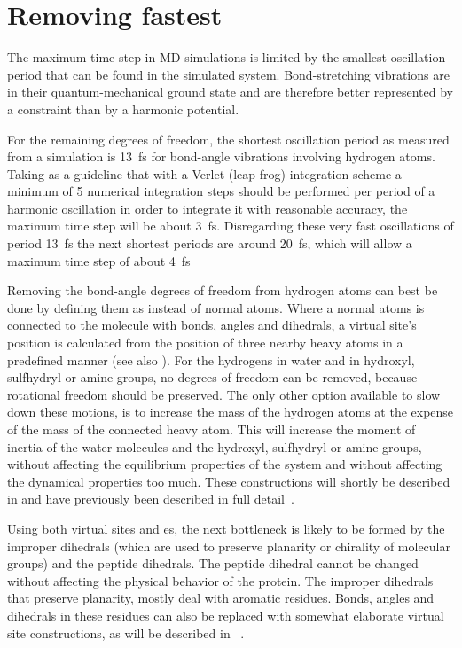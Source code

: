 \section{Removing fastest }
The maximum time step in MD simulations is limited by the smallest
oscillation period that can be found in the simulated
system. Bond-stretching vibrations are in their quantum-mechanical
ground state and are therefore better represented by a constraint than
by a harmonic potential.

For the remaining degrees of freedom, the shortest oscillation period
as measured from a simulation is 13~fs for bond-angle vibrations
involving hydrogen atoms. Taking as a guideline that with a Verlet
(leap-frog) integration scheme a minimum of 5 numerical integration
steps should be performed per period of a harmonic oscillation in
order to integrate it with reasonable accuracy, the maximum time step
will be about 3~fs. Disregarding these very fast oscillations of
period 13~fs the next shortest periods are around 20~fs, which will
allow a maximum time step of about 4~fs

Removing the bond-angle degrees of freedom from hydrogen atoms can
best be done by defining them as 
instead of normal atoms. Where a normal atoms is connected to the molecule
with bonds, angles and dihedrals, a virtual site's position is calculated
from the position of three nearby heavy atoms in a predefined manner
(see also ). For the hydrogens in water and in
hydroxyl, sulfhydryl or amine groups, no degrees of freedom can be
removed, because rotational freedom should be preserved. The only
other option available to slow down these motions, is to increase the
mass of the hydrogen atoms at the expense of the mass of the connected
heavy atom. This will increase the moment of inertia of the water
molecules and the hydroxyl, sulfhydryl or amine groups, without
affecting the equilibrium properties of the system and without
affecting the dynamical properties too much. These constructions will
shortly be described in  and have previously
been described in full detail~\cite{feenstra99}.

Using both virtual sites and es, the next
bottleneck is likely to be formed by the improper dihedrals (which are
used to preserve planarity or chirality of molecular groups) and the
peptide dihedrals. The peptide dihedral cannot be changed without
affecting the physical behavior of the protein. The improper dihedrals
that preserve planarity, mostly deal with aromatic residues. Bonds,
angles and dihedrals in these residues can also be replaced with
somewhat elaborate virtual site constructions, as will be described in
~\cite{feenstra01}.

